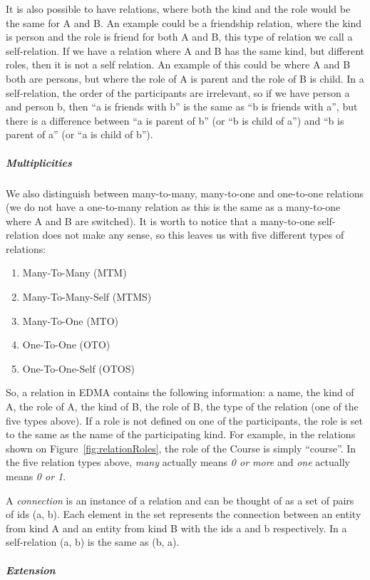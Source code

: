 It is also possible to have relations, where both the kind and the
role would be the same for A and B. An example could be a friendship
relation, where the kind is person and the role is friend for both
A and B, this type of relation we call a self-relation. If we have
a relation where A and B has the same kind, but different roles, then
it is not a self relation. An example of this could be where A and
B both are persons, but where the role of A is parent and the role
of B is child. In a self-relation, the order of the participants are
irrelevant, so if we have person a and person b, then ``a is friends
with b'' is the same as ``b is friends with a'', but there is a
difference between ``a is parent of b'' (or ``b is child of a'')
and ``b is parent of a'' (or ``a is child of b'').


\subparagraph{Multiplicities}

We also distinguish between many-to-many, many-to-one and one-to-one
relations (we do not have a one-to-many relation as this is the same
as a many-to-one where A and B are switched). It is worth to notice
that a many-to-one self-relation does not make any sense, so this
leaves us with five different types of relations:
\begin{enumerate}
\item Many-To-Many (MTM)
\item Many-To-Many-Self (MTMS)
\item Many-To-One (MTO)
\item One-To-One (OTO)
\item One-To-One-Self (OTOS)
\end{enumerate}
So, a relation in EDMA contains the following information: a name,
the kind of A, the role of A, the kind of B, the role of B, the type
of the relation (one of the five types above). If a role is not defined
on one of the participants, the role is set to the same as the name
of the participating kind. For example, in the relations shown on
Figure~\ref{fig:relationRoles}, the role of the Course is simply
``course''. In the five relation types above, \emph{many} actually
means \emph{0 or more} and \emph{one} actually means \emph{0 or 1}.

A \emph{connection} is an instance of a relation and can be thought
of as a set of pairs of ids (a, b). Each element in the set represents
the connection between an entity from kind A and an entity from kind
B with the ids a and b respectively. In a self-relation (a, b) is
the same as (b, a).


\subparagraph{Extension}

